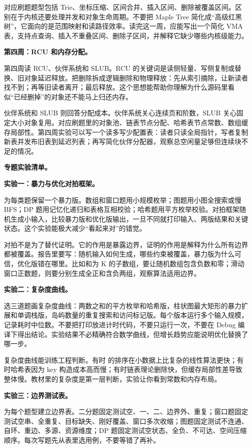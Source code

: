 对应刷题题型包括 Trie、坐标压缩、区间合并、插入区间、删除被覆盖区间。区别在于内核还要处理并发和对象生命周期。不要把 Maple Tree 简化成“高级红黑树”，它面向的是范围映射和读路径效率。读完这一周，应能写出一个简化 VMA 表，支持点查询、插入不重叠区间、删除子区间，并解释它缺少哪些内核级能力。

\noindent\textbf{第四周：RCU 和内存分配。}

第四周读 RCU、伙伴系统和 SLUB。RCU 的关键词是读侧轻量、写侧复制或替换、旧对象延迟释放。把删除拆成逻辑删除和物理释放：先从索引摘除，让新读者找不到；再等旧读者离开；最后释放。这个思想能帮助你理解为什么源码里看似“已经删掉”的对象还不能马上归还内存。

伙伴系统和 SLUB 则回答分配成本。伙伴系统关心连续页和阶数，SLUB 关心固定大小对象复用。对应刷题里的对象池、链表节点分配、哈希表节点常数、数组缓存局部性。第四周实验可以写一个读多写少配置表：读者只读全局指针，写者复制新表并发布旧表到延迟列表；再写简化伙伴分配器，观察总空闲量足够但连续块不足的情况。

\noindent\textbf{专题实验清单。}

\noindent\textbf{实验一：暴力与优化对拍框架。}

为每类题保留一个暴力版。数组和窗口题用小规模枚举；图题用小图全搜索或慢 BFS；DP 题用记忆化递归和表格互相校验；哈希题用平方枚举校验。对拍框架随机生成小输入，比较暴力版和优化版输出，一旦不同就打印输入、两版结果和关键状态。这个实验能极大减少“看起来对”的错觉。

对拍不是为了替代证明。它的作用是暴露边界，证明的作用是解释为什么所有边界都被覆盖。报告里要写：随机输入如何生成，哪些约束被覆盖，暴力版为什么可信，优化版错在哪里。比如和为 K 的子数组，要让随机数组包含负数和零；滑动窗口正数题，则要分别生成全正和含负两组，观察算法适用边界。

\noindent\textbf{实验二：复杂度曲线。}

选三道题画复杂度曲线：两数之和的平方枚举和哈希版，柱状图最大矩形的暴力扩展和单调栈版，岛屿数量的重复搜索和访问标记版。每个版本运行多个输入规模，记录耗时中位数。不要把打印放进计时代码，不要只运行一次，不要在 Debug 编译下得出结论。实验结果不必精确符合数学曲线，但增长趋势应能说明优化替换了哪一步。

复杂度曲线能训练工程判断。有时  的排序在小数据上比复杂的线性算法更快；有时哈希表因为 key 构造成本高而慢；有时链表理论删除快，但缓存局部性差导致整体慢。教材里的复杂度是第一层判断，实验让你看到常数和内存布局。

\noindent\textbf{实验三：边界测试表。}

为每个题型建立边界表。二分题固定测试空、一、二、边界外、重复；窗口题固定测试空串、全重复、目标缺失、刚好覆盖、窗口多次收缩；图题固定测试不连通、自环、重边、多源、资源维度；DP 题固定测试空状态、全负、不可达、空间压缩顺序。每次写题先从表里选用例，不要等错了再补。

